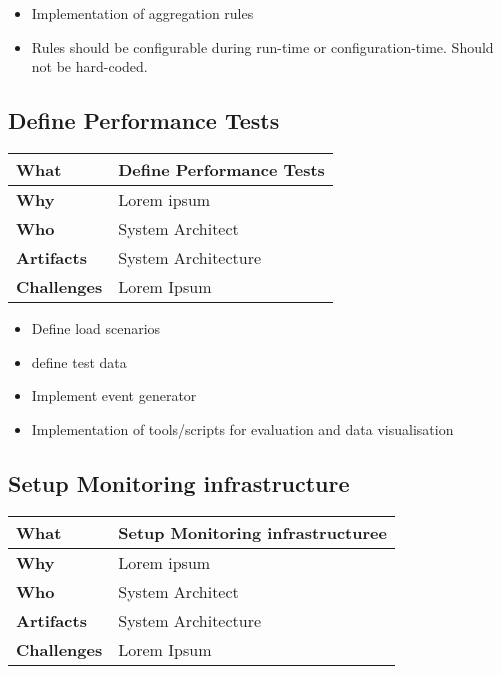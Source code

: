 \begin{itemize}
	\item Implementation of aggregation rules
	\item Rules should be configurable during run-time or configuration-time. Should not be hard-coded.
\end{itemize}

\subsection{Define Performance Tests}
\begin{minipage}{\textwidth}
 \label{table:ch6_Task_Define_Performance_Tests}
\begin{tabular}
	{|m{3cm}|m{10cm}|} \hline \bfseries What & Define Performance Tests\\
	\hline \bfseries Why & Lorem ipsum\\
	\hline \bfseries Who & System Architect\\
	\hline \bfseries Artifacts & System Architecture\\
	\hline \bfseries Challenges & Lorem Ipsum\\
	\hline 
\end{tabular}
\end{minipage}

\begin{itemize}
	\item Define load scenarios
	\item define test data
	\item Implement event generator
	\item Implementation of tools/scripts for evaluation and data visualisation
\end{itemize}

\subsection{Setup Monitoring infrastructure}
\begin{minipage}{\textwidth}
 \label{table:ch6_Task_Setup_Monitoring_infrastructure}
\begin{tabular}
	{|m{3cm}|m{10cm}|} \hline \bfseries What & Setup Monitoring infrastructuree\\
	\hline \bfseries Why & Lorem ipsum\\
	\hline \bfseries Who & System Architect\\
	\hline \bfseries Artifacts & System Architecture\\
	\hline \bfseries Challenges & Lorem Ipsum\\
	\hline 
\end{tabular}
\end{minipage}


